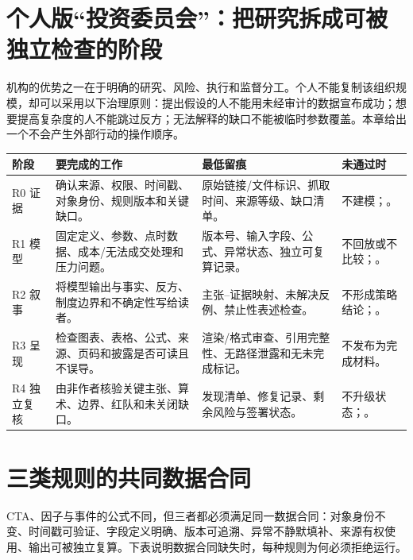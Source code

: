 \section{个人版“投资委员会”：把研究拆成可被独立检查的阶段}

机构的优势之一在于明确的研究、风险、执行和监督分工。个人不能复制该组织规模，却可以采用以下治理原则：提出假设的人不能用未经审计的数据宣布成功；想要提高复杂度的人不能跳过反方；无法解释的缺口不能被临时参数覆盖。本章给出一个不会产生外部行动的操作顺序。

\begin{exhibitbox}
\small
\begin{tabularx}{\exhibitboxwidth}{L{1.5cm}L{2.7cm}X L{3.25cm}}
\toprule
\textbf{阶段} & \textbf{要完成的工作} & \textbf{最低留痕} & \textbf{未通过时} \\
\midrule
R0 证据 & 确认来源、权限、时间戳、对象身份、规则版本和关键缺口。 & 原始链接/文件标识、抓取时间、来源等级、缺口清单。 & 不建模；\qzero{}。 \\
R1 模型 & 固定定义、参数、点时数据、成本/无法成交处理和压力问题。 & 版本号、输入字段、公式、异常状态、独立可复算记录。 & 不回放或不比较；\qzero{}。 \\
R2 叙事 & 将模型输出与事实、反方、制度边界和不确定性写给读者。 & 主张--证据映射、未解决反例、禁止性表述检查。 & 不形成策略结论；\qzero{}。 \\
R3 呈现 & 检查图表、表格、公式、来源、页码和披露是否可读且不误导。 & 渲染/格式审查、引用完整性、无路径泄露和无未完成标记。 & 不发布为完成材料。 \\
R4 独立复核 & 由非作者核验关键主张、算术、边界、红队和未关闭缺口。 & 发现清单、修复记录、剩余风险与签署状态。 & 不升级状态；\qzero{}。 \\
\bottomrule
\end{tabularx}
\end{exhibitbox}

\section{三类规则的共同数据合同}

CTA、因子与事件的公式不同，但三者都必须满足同一数据合同：对象身份不变、时间戳可验证、字段定义明确、版本可追溯、异常不静默填补、来源有权使用、输出可被独立复算。下表说明数据合同缺失时，每种规则为何必须拒绝运行。

